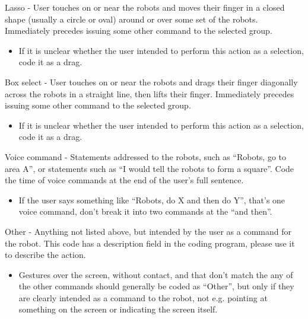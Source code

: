 Lasso - User touches on or near the robots and moves their finger in a closed shape (usually a circle or oval) around or over some set of the robots. Immediately precedes issuing some other command to the selected group. 
\begin{itemize}
	\item If it is unclear whether the user intended to perform this action as a selection, code it as a drag. 
\end{itemize}

Box select - User touches on or near the robots and drags their finger diagonally across the robots in a straight line, then lifts their finger. Immediately precedes issuing some other command to the selected group. 
\begin{itemize}
	\item If it is unclear whether the user intended to perform this action as a selection, code it as a drag.  
\end{itemize}

Voice command - Statements addressed to the robots, such as ``Robots, go to area A'', or statements such as ``I would tell the robots to form a square''. Code the time of voice commands at the end of the user's full sentence. 
\begin{itemize}
	\item If the user says something like ``Robots, do X and then do Y'', that's one voice command, don't break it into two commands at the ``and then''. 
\end{itemize}

Other - Anything not listed above, but intended by the user as a command for the robot. This code has a description field in the coding program, please use it to describe the action. 
\begin{itemize}
	\item Gestures over the screen, without contact, and that don't match the any of the other commands should generally be coded as ``Other'', but only if they are clearly intended as a command to the robot, not e.g. pointing at something on the screen or indicating the screen itself. 
\end{itemize}